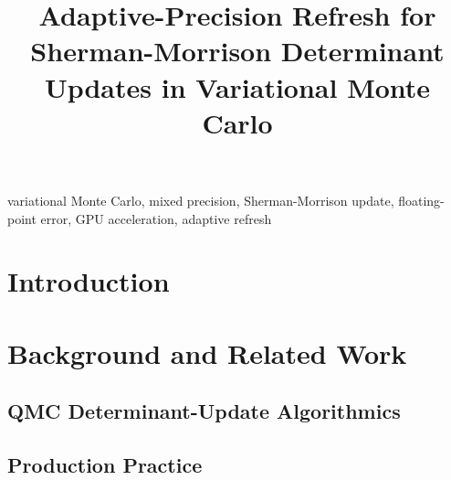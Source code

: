 \documentclass[conference]{IEEEtran}
\begin{document}
\title{Adaptive-Precision Refresh for Sherman-Morrison Determinant Updates in Variational Monte Carlo}

\author{
  \and
}

\maketitle

\begin{abstract}
\end{abstract}

\begin{IEEEkeywords}
variational Monte Carlo, mixed precision, Sherman-Morrison update, floating-point error, GPU acceleration, adaptive refresh
\end{IEEEkeywords}

\section{Introduction}

\section{Background and Related Work}

\subsection{QMC Determinant-Update Algorithmics}

\subsection{Production Practice}
\end{document}
